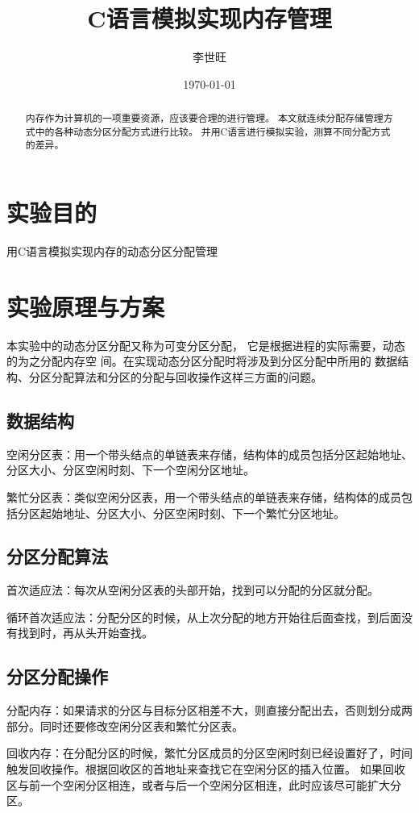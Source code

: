 \documentclass[UTF8]{ctexart}
\title{C语言模拟实现内存管理}
\author{李世旺}
\date{\today}
\begin{document}
\maketitle
\begin{abstract}
内存作为计算机的一项重要资源，应该要合理的进行管理。
本文就连续分配存储管理方式中的各种动态分区分配方式进行比较。
并用C语言进行模拟实验，测算不同分配方式的差异。
\end{abstract}
\newpage

\tableofcontents
\newpage
\section{实验目的}
用C语言模拟实现内存的动态分区分配管理
\section{实验原理与方案}
本实验中的动态分区分配又称为可变分区分配，
它是根据进程的实际需要，动态的为之分配内存空
间。在实现动态分区分配时将涉及到分区分配中所用的
数据结构、分区分配算法和分区的分配与回收操作这样三方面的问题。
\subsection{数据结构}
空闲分区表：用一个带头结点的单链表来存储，结构体的成员包括分区起始地址、分区大小、分区空闲时刻、下一个空闲分区地址。

繁忙分区表：类似空闲分区表，用一个带头结点的单链表来存储，结构体的成员包括分区起始地址、分区大小、分区空闲时刻、下一个繁忙分区地址。
\subsection{分区分配算法}
首次适应法：每次从空闲分区表的头部开始，找到可以分配的分区就分配。

循环首次适应法：分配分区的时候，从上次分配的地方开始往后面查找，到后面没有找到时，再从头开始查找。
\subsection{分区分配操作}
分配内存：如果请求的分区与目标分区相差不大，则直接分配出去，否则划分成两部分。同时还要修改空闲分区表和繁忙分区表。

回收内存：在分配分区的时候，繁忙分区成员的分区空闲时刻已经设置好了，时间触发回收操作。根据回收区的首地址来查找它在空闲分区的插入位置。
如果回收区与前一个空闲分区相连，或者与后一个空闲分区相连，此时应该尽可能扩大分区。
\end{document}
